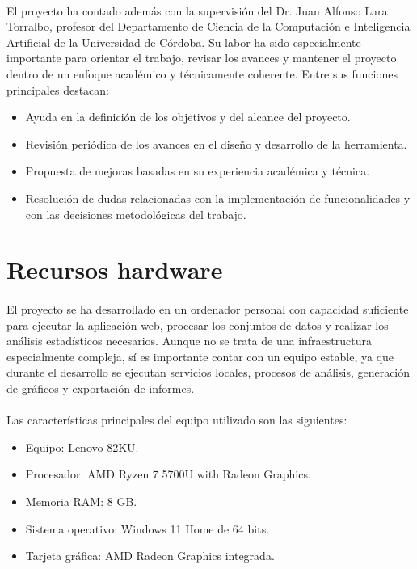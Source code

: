 \paragraph*{}El proyecto ha contado además con la supervisión del Dr. Juan Alfonso Lara Torralbo, profesor del Departamento de Ciencia de la Computación e Inteligencia Artificial de la Universidad de Córdoba. Su labor ha sido especialmente importante para orientar el trabajo, revisar los avances y mantener el proyecto dentro de un enfoque académico y técnicamente coherente. Entre sus funciones principales destacan:

\begin{itemize}
    \item Ayuda en la definición de los objetivos y del alcance del proyecto.
    \item Revisión periódica de los avances en el diseño y desarrollo de la herramienta.
    \item Propuesta de mejoras basadas en su experiencia académica y técnica.
    \item Resolución de dudas relacionadas con la implementación de funcionalidades y con las decisiones metodológicas del trabajo.
\end{itemize}

\section{Recursos hardware}
\paragraph*{}El proyecto se ha desarrollado en un ordenador personal con capacidad suficiente para ejecutar la aplicación web, procesar los conjuntos de datos y realizar los análisis estadísticos necesarios. Aunque no se trata de una infraestructura especialmente compleja, sí es importante contar con un equipo estable, ya que durante el desarrollo se ejecutan servicios locales, procesos de análisis, generación de gráficos y exportación de informes.

\paragraph*{}Las características principales del equipo utilizado son las siguientes:

\begin{itemize}
    \item Equipo: Lenovo 82KU.
    \item Procesador: AMD Ryzen 7 5700U with Radeon Graphics.
    \item Memoria RAM: 8 GB.
    \item Sistema operativo: Windows 11 Home de 64 bits.
    \item Tarjeta gráfica: AMD Radeon Graphics integrada.
\end{itemize}

